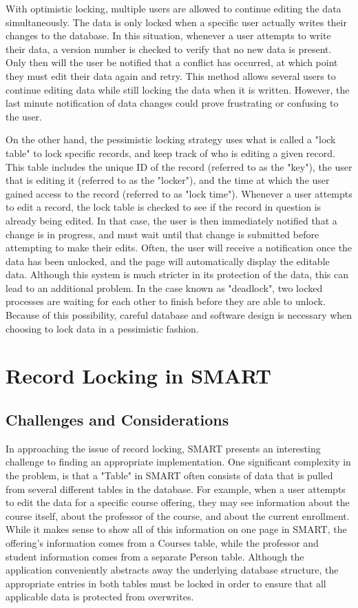 \documentclass[12pt]{article}
\begin{document}
With optimistic locking, multiple users are allowed to continue editing the data simultaneously. The data is only locked when a specific user actually writes their changes to the database. In this situation, whenever a user attempts to write their data, a version number is checked to verify that no new data is present. Only then will the user be notified that a conflict has occurred, at which point they must edit their data again and retry. This method allows several users to continue editing data while still locking the data when it is written. However, the last minute notification of data changes could prove frustrating or confusing to the user.

On the other hand, the pessimistic locking strategy uses what is called a "lock table" to lock specific records, and keep track of who is editing a given record. This table includes the unique ID of the record (referred to as the "key"), the user that is editing it (referred to as the "locker"), and the time at which the user gained access to the record (referred to as "lock time"). Whenever a user attempts to edit a record, the lock table is checked to see if the record in question is already being edited. In that case, the user is then immediately notified that a change is in progress, and must wait until that change is submitted before attempting to make their edits. Often, the user will receive a notification once the data has been unlocked, and the page will automatically display the editable data. Although this system is much stricter in its protection of the data, this can lead to an additional problem. In the case known as "deadlock", two locked processes are waiting for each other to finish before they are able to unlock. Because of this possibility, careful database and software design is necessary when choosing to lock data in a pessimistic fashion.

\newpage
\section{Record Locking in SMART}

\subsection{Challenges and Considerations}

In approaching the issue of record locking, SMART presents an interesting challenge to finding an appropriate implementation. One significant complexity in the problem, is that a "Table" in SMART often consists of data that is pulled from several different tables in the database. For example, when a user attempts to edit the data for a specific course offering, they may see information about the course itself, about the professor of the course, and about the current enrollment. While it makes sense to show all of this information on one page in SMART, the offering's information comes from a Courses table, while the professor and student information comes from a separate Person table. Although the application conveniently abstracts away the underlying database structure, the appropriate entries in both tables must be locked in order to ensure that all applicable data is protected from overwrites.
\end{document}
